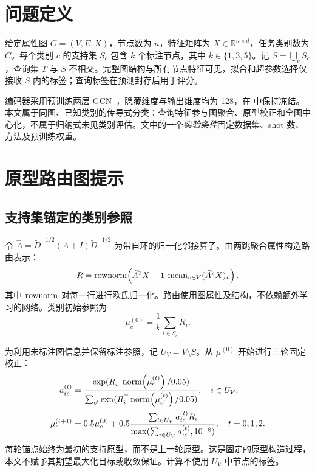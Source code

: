 \section{问题定义}
给定属性图 $G=(V,E,X)$，节点数为 $n$，特征矩阵为 $X\in\mathbb R^{n\times d}$，任务类别数为 $C$。每个类别 $c$ 的支持集 $S_c$ 包含 $k$ 个标注节点，其中 $k\in\{1,3,5\}$。记 $S=\bigcup_c S_c$，查询集 $T$ 与 $S$ 不相交。完整图结构与所有节点特征可见，拟合和超参数选择仅接收 $S$ 内的标签；查询标签在预测封存后用于评分。

编码器采用预训练两层 GCN~\citep{gcn2017}，隐藏维度与输出维度均为 128，在 \method 中保持冻结。本文属于同图、已知类别的传导式分类：查询特征参与图聚合、原型校正和全图中心化，不属于归纳式未见类别评估。文中的一个\emph{实验条件}固定数据集、shot 数、方法及预训练权重。

\section{原型路由图提示}
\label{sec:method}

\subsection{支持集锚定的类别参照}
令 $\widehat A=\widetilde D^{-1/2}(A+I)\widetilde D^{-1/2}$ 为带自环的归一化邻接算子。由两跳聚合属性构造路由表示：
\begin{equation}
R=\operatorname{rownorm}\!\left(\widehat A^2X-\mathbf1\,\operatorname{mean}_{v\in V}(\widehat A^2X)_v\right).
\label{eq:attributes}
\end{equation}
其中 $\operatorname{rownorm}$ 对每一行进行欧氏归一化。路由使用图属性及结构，不依赖额外学习的网络。类别初始参照为
\begin{equation}
\mu_c^{(0)}=\frac{1}{k}\sum_{i\in S_c}R_i.
\label{eq:anchor}
\end{equation}

为利用未标注图信息并保留标注参照，记 $U_V=V\setminus S$。从 $\mu^{(0)}$ 开始进行三轮固定校正：
\begin{align}
a_{ic}^{(t)}&=\frac{\exp(R_i^\top\operatorname{norm}\!\left(\mu_c^{(t)}\right)/0.05)}{\sum_{c'}\exp(R_i^\top\operatorname{norm}\!\left(\mu_{c'}^{(t)}\right)/0.05)},\quad i\in U_V,\label{eq:assignment}\\
\mu_c^{(t+1)}&=0.5\mu_c^{(0)}+0.5\frac{\sum_{i\in U_V}a_{ic}^{(t)}R_i}{\max(\sum_{i\in U_V}a_{ic}^{(t)},10^{-8})},\quad t=0,1,2.\label{eq:refinement}
\end{align}
每轮锚点始终为最初的支持原型，而不是上一轮原型。这是固定的原型构造过程，本文不赋予其期望最大化目标或收敛保证。计算不使用 $U_V$ 中节点的标签。

